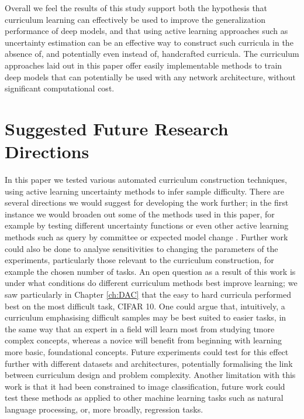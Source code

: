 Overall we feel the results of this study support both the hypothesis that curriculum learning can effectively be used to improve the generalization performance of deep models, and that using active learning approaches such as uncertainty estimation can be an effective way to construct such curricula in the absence of, and potentially even instead of, handcrafted curricula. The curriculum approaches laid out in this paper offer easily implementable methods to train deep models that can potentially be used with any network architecture, without significant computational cost. 

\section{Suggested Future Research Directions}
In this paper we tested various automated curriculum construction techniques, using active learning uncertainty methods to infer sample difficulty. There are several directions we would suggest for developing the work further; in the first instance we would broaden out some of the methods used in this paper, for example by testing different uncertainty functions or even other active learning methods such as query by committee or expected model change \cite{settles2012active}. Further work could also be done to analyse sensitivities to changing the parameters of the experiments, particularly those relevant to the curriculum construction, for example the chosen number of tasks. An open question as a result of this work is under what conditions do different curriculum methods best improve learning; we saw particularly in Chapter \ref{ch:DAC} that the easy to hard curricula performed best on the most difficult task, CIFAR 10. One could argue that, intuitively, a curriculum emphasising difficult samples may be best suited to easier tasks, in the same way that an expert in a field will learn most from studying tmore complex concepts, whereas a novice will benefit from beginning with learning more basic, foundational concepts.  Future experiments could test for this effect further with different datasets and architectures, potentially formalising the link between curriculum design and problem complexity. Another limitation with this work is that it had been constrained to image classification, future work could test these methods as applied to other machine learning tasks such as natural language processing, or, more broadly, regression tasks.



